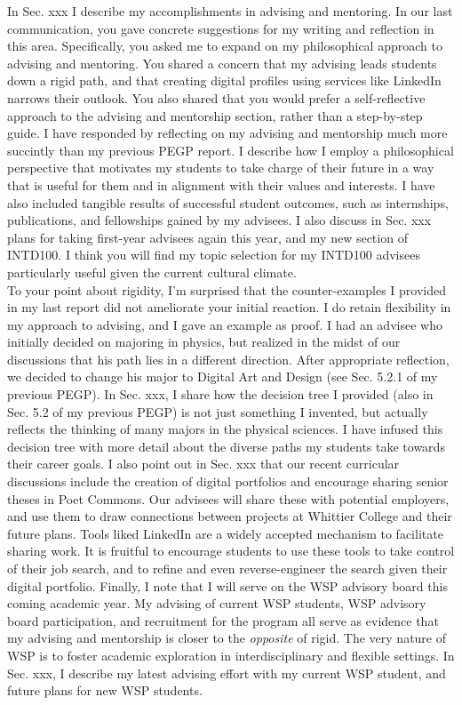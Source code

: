 \documentclass[../../main.tex]{subfiles}
\begin{document}
\vspace{0.25cm}
In Sec. xxx I describe my accomplishments in advising and mentoring.  In our last communication, you gave concrete suggestions for my writing and reflection in this area.  Specifically, you asked me to expand on my philosophical approach to advising and mentoring.  You shared a concern that my advising leads students down a rigid path, and that creating digital profiles using services like LinkedIn narrows their outlook.  You also shared that you would prefer a self-reflective approach to the advising and mentorship section, rather than a step-by-step guide.  I have responded by reflecting on my advising and mentorship much more succintly than my previous PEGP report.  I describe how I employ a philosophical perspective that motivates my students to take charge of their future in a way that is useful for them and in alignment with their values and interests.  I have also included tangible results of successful student outcomes, such as internships, publications, and fellowships gained by my advisees.  I also discuss in Sec. xxx plans for taking first-year advisees again this year, and my new section of INTD100.  I think you will find my topic selection for my INTD100 advisees particularly useful given the current cultural climate.
\\
\vspace{0.25cm}
To your point about rigidity, I'm surprised that the counter-examples I provided in my last report did not ameliorate your initial reaction.  I do retain flexibility in my approach to advising, and I gave an example as proof.  I had an advisee who initially decided on majoring in physics, but realized in the midst of our discussions that his path lies in a different direction.  After appropriate reflection, we decided to change his major to Digital Art and Design (see Sec. 5.2.1 of my previous PEGP).  In Sec. xxx, I share how the decision tree I provided (also in Sec. 5.2 of my previous PEGP) is not just something I invented, but actually reflects the thinking of many majors in the physical sciences.  I have infused this decision tree with more detail about the diverse paths my students take towards their career goals.  I also point out in Sec. xxx that our recent curricular discussions include the creation of digital portfolios and encourage sharing senior theses in Poet Commons.  Our advisees will share these with potential employers, and use them to draw connections between projects at Whittier College and their future plans.  Tools liked LinkedIn are a widely accepted mechanism to facilitate sharing work.  It is fruitful to encourage students to use these tools to take control of their job search, and to refine and even reverse-engineer the search given their digital portfolio. Finally, I note that I will serve on the WSP advisory board this coming academic year.  My advising of current WSP students, WSP advisory board participation, and recruitment for the program all serve as evidence that my advising and mentorship is closer to the \textit{opposite} of rigid.  The very nature of WSP is to foster academic exploration in interdisciplinary and flexible settings.  In Sec. xxx, I describe my latest advising effort with my current WSP student, and future plans for new WSP students.
\end{document}
